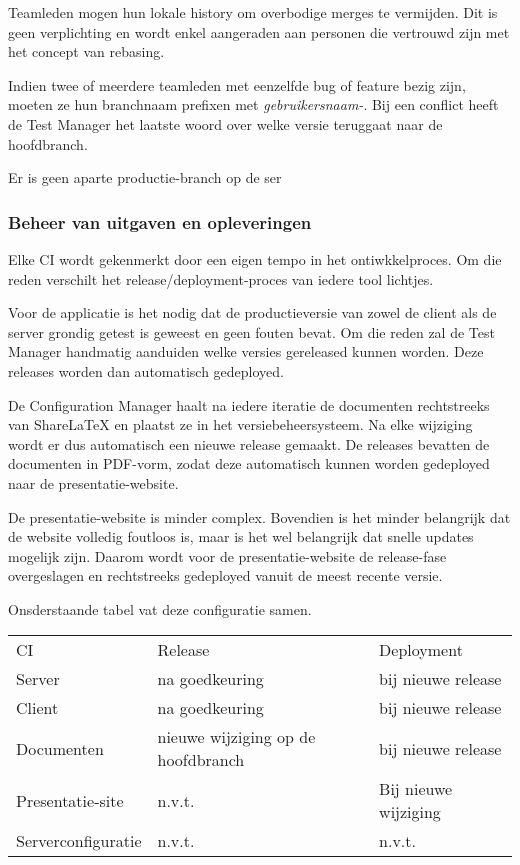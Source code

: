 Teamleden mogen hun lokale history  om overbodige merges te vermijden. Dit is geen verplichting en wordt enkel aangeraden aan personen die vertrouwd zijn met het concept van rebasing.

Indien twee of meerdere teamleden met eenzelfde bug of feature bezig zijn, moeten ze hun branchnaam prefixen met \textit{gebruikersnaam-}. Bij een conflict heeft de Test Manager het laatste woord over welke versie teruggaat naar de hoofdbranch.

Er is geen aparte productie-branch op de ser

\subsubsection{Beheer van uitgaven en opleveringen}

Elke CI wordt gekenmerkt door een eigen tempo in het ontiwkkelproces. Om die reden verschilt het release/deployment-proces van iedere tool lichtjes.

Voor de applicatie is het nodig dat de productieversie van zowel de client als de server grondig getest is geweest en geen fouten bevat. Om die reden zal de Test Manager handmatig aanduiden welke versies gereleased kunnen worden. Deze releases worden dan automatisch gedeployed.

De Configuration Manager haalt na iedere iteratie de documenten rechtstreeks van ShareLaTeX en plaatst ze in het versiebeheersysteem. Na elke wijziging wordt er dus automatisch een nieuwe release gemaakt. De releases bevatten de documenten in PDF-vorm, zodat deze automatisch kunnen worden gedeployed naar de presentatie-website.

De presentatie-website is minder complex. Bovendien is het minder belangrijk dat de website volledig foutloos is, maar is het wel belangrijk dat snelle updates mogelijk zijn. Daarom wordt voor de presentatie-website de release-fase overgeslagen en rechtstreeks gedeployed vanuit de meest recente versie.

Onsderstaande tabel vat deze configuratie samen.

\begin{tabular}{l|l|l}
CI & Release & Deployment \\
Server & na goedkeuring & bij nieuwe release \\
Client & na goedkeuring & bij nieuwe release \\
Documenten & nieuwe wijziging op de hoofdbranch & bij nieuwe release \\
Presentatie-site & n.v.t. & Bij nieuwe wijziging \\
Serverconfiguratie & n.v.t. & n.v.t. 
\end{tabular}

